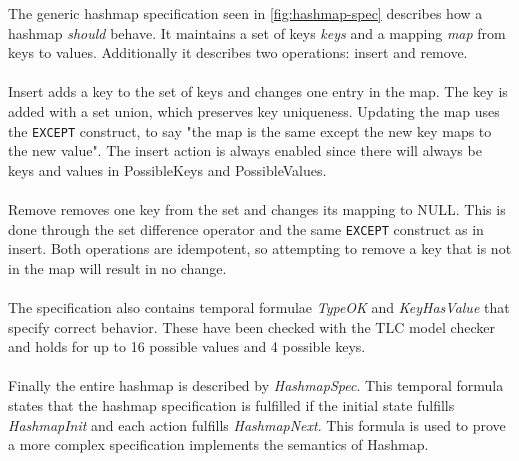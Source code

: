 \documentclass{uit-thesis}
\begin{document}
The generic hashmap specification seen in \autoref{fig:hashmap-spec} describes how a hashmap \textit{should} behave. It maintains a set of keys \textit{keys} and a mapping \textit{map} from keys to values. Additionally it describes two operations: insert and remove.
\\\\
Insert adds a key to the set of keys and changes one entry in the map. The key is added with a set union, which preserves key uniqueness. Updating the map uses the \texttt{EXCEPT} construct, to say "the map is the same except the new key maps to the new value". The insert action is always enabled since there will always be keys and values in PossibleKeys and PossibleValues.
\\\\
Remove removes one key from the set and changes its mapping to NULL. This is done through the set difference operator and the same \texttt{EXCEPT} construct as in insert. Both operations are idempotent, so attempting to remove a key that is not in the map will result in no change.
\\\\
The specification also contains temporal formulae \textit{TypeOK} and \textit{KeyHasValue} that specify correct behavior. These have been checked with the TLC model checker and holds for up to 16 possible values and 4 possible keys.
\\\\
Finally the entire hashmap is described by \textit{HashmapSpec}. This temporal formula states that the hashmap specification is fulfilled if the initial state fulfills \textit{HashmapInit} and each action fulfills \textit{HashmapNext}. This formula is used to prove a more complex specification implements the semantics of Hashmap.
\end{document}
